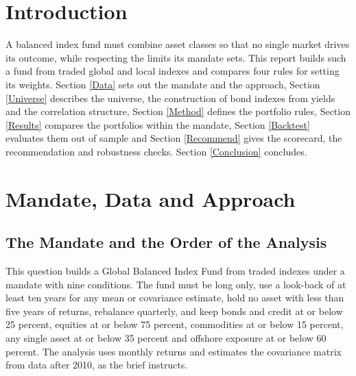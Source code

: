 \documentclass[11pt,preprint]{elsarticle}
\numberwithin{equation}{section}
\numberwithin{figure}{section}
\numberwithin{table}{section}
\begin{document}
\setcounter{footnote}{0}



\pagestyle{fancy}
\chead{}
\rhead{}
\lfoot{}
\lhead{}
\cfoot{}


\headsep 35pt %




\section{\texorpdfstring{Introduction
\label{Intro}}{Introduction }}\label{introduction}

A balanced index fund must combine asset classes so that no single
market drives its outcome, while respecting the limits its mandate sets.
This report builds such a fund from traded global and local indexes and
compares four rules for setting its weights. Section \ref{Data} sets out
the mandate and the approach, Section \ref{Universe} describes the
universe, the construction of bond indexes from yields and the
correlation structure, Section \ref{Method} defines the portfolio rules,
Section \ref{Results} compares the portfolios within the mandate,
Section \ref{Backtest} evaluates them out of sample and Section
\ref{Recommend} gives the scorecard, the recommendation and robustness
checks. Section \ref{Conclusion} concludes.

\section{\texorpdfstring{Mandate, Data and Approach
\label{Data}}{Mandate, Data and Approach }}\label{mandate-data-and-approach}

\subsection{The Mandate and the Order of the
Analysis}\label{the-mandate-and-the-order-of-the-analysis}

This question builds a Global Balanced Index Fund from traded indexes
under a mandate with nine conditions. The fund must be long only, use a
look-back of at least ten years for any mean or covariance estimate,
hold no asset with less than five years of returns, rebalance quarterly,
and keep bonds and credit at or below 25 percent, equities at or below
75 percent, commodities at or below 15 percent, any single asset at or
below 35 percent and offshore exposure at or below 60 percent. The
analysis uses monthly returns and estimates the covariance matrix from
data after 2010, as the brief instructs.
\end{document}

